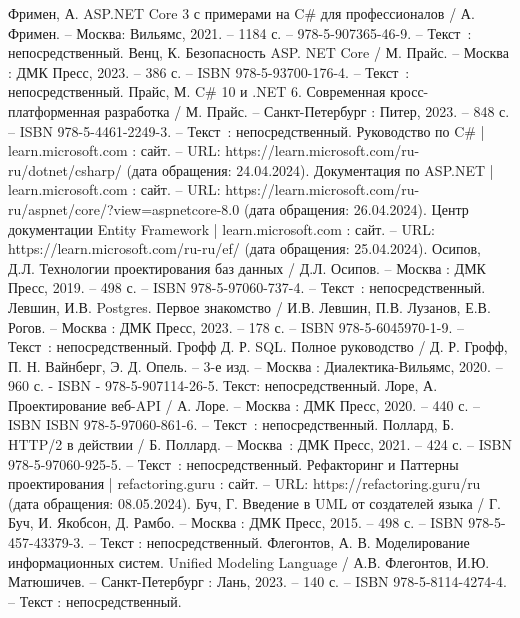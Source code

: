
\begin{thebibliography}{9}
	 Фримен, А. ASP.NET Core 3 с примерами на C\# для профессионалов / А. Фримен. – Москва: Вильямс, 2021. – 1184 с. – 978-5-907365-46-9. – Текст~: непосредственный.
	 Венц, К. Безопасность ASP. NET Core / М. Прайс. – Москва : ДМК Пресс, 2023. – 386 с. – ISBN 978-5-93700-176-4. – Текст~: непосредственный.
	 Прайс, М. C\# 10 и .NET 6. Современная кросс-платформенная разработка / М. Прайс. – Санкт-Петербург : Питер, 2023. – 848 с. – ISBN 978-5-4461-2249-3. – Текст~: непосредственный.
	 Руководство по C\# | learn.microsoft.com : сайт. – URL: https://learn.microsoft.com/ru-ru/dotnet/csharp/ (дата обращения: 24.04.2024).
	 Документация по ASP.NET | learn.microsoft.com : сайт. – URL: https://learn.microsoft.com/ru-ru/aspnet/core/?view=aspnetcore-8.0 (дата обращения: 26.04.2024).
	 Центр документации Entity Framework | learn.microsoft.com : сайт. – URL: https://learn.microsoft.com/ru-ru/ef/ (дата обращения: 25.04.2024).
	 Осипов, Д.Л. Технологии проектирования баз данных / Д.Л. Осипов. – Москва : ДМК Пресс, 2019. – 498 с. – ISBN 978-5-97060-737-4. – Текст~: непосредственный.
	 Левшин, И.В. Postgres. Первое знакомство / И.В. Левшин, П.В. Лузанов, Е.В. Рогов. – Москва : ДМК Пресс, 2023. – 178 с. – ISBN 978-5-6045970-1-9. – Текст~: непосредственный.
	 Грофф Д. Р. SQL. Полное руководство / Д. Р. Грофф, П. Н. Вайнберг, Э. Д. Опель. – 3-е изд. – Москва : Диалектика-Вильямс, 2020. – 960 с. - ISBN - 978-5-907114-26-5. Текст: непосредственный.
	 Лоре, А. Проектирование веб-API / А. Лоре. – Москва : ДМК Пресс, 2020. – 440 с. – ISBN ISBN 978-5-97060-861-6. – Текст~: непосредственный.
	 Поллард, Б. HTTP/2 в действии / Б. Поллард. – Москва~: ДМК Пресс, 2021. – 424 с. – ISBN 978-5-97060-925-5. – Текст~: непосредственный.
	 Рефакторинг и Паттерны проектирования | refactoring.guru : сайт. – URL: https://refactoring.guru/ru (дата обращения: 08.05.2024).
	 Буч, Г. Введение в UML от создателей языка / Г. Буч, И. Якобсон, Д. Рамбо. – Москва : ДМК Пресс, 2015. – 498 с. – ISBN 978-5-457-43379-3. – Текст : непосредственный.
	 Флегонтов, А. В. Моделирование информационных систем. Unified Modeling Language / А.В. Флегонтов, И.Ю. Матюшичев. – Санкт-Петербург : Лань, 2023. – 140 с. – ISBN 978-5-8114-4274-4. – Текст : непосредственный.

\end{thebibliography}

